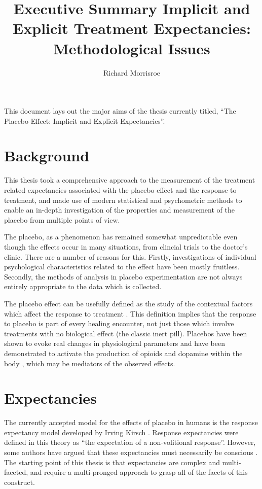 \documentclass{article}
\title{Executive Summary Implicit and Explicit Treatment Expectancies: Methodological Issues}
\author{Richard Morrisroe}
\begin{document}
\maketitle

This document lays out the major aims of the thesis currently titled, ``The Placebo Effect: Implicit and Explicit Expectancies''. 

\section{Background}
\label{sec:background}

This thesis took a comprehensive approach to the measurement of the treatment related expectancies associated with the placebo effect and the response to treatment, and made use of modern statistical and psychometric methods to enable an in-depth investigation of the properties and measurement of the placebo from multiple points of view. 

The placebo, as a phenomenon has remained somewhat unpredictable even though the effects occur in many situations, from clincial trials to the doctor's clinic. There are a number of reasons for this. Firstly, investigations of individual psychological characteristics related to the effect have been mostly fruitless. Secondly, the methods of analysis in placebo experimentation are not always entirely appropriate to the data which is collected.

The placebo effect can be usefully defined as the study of the contextual factors which affect the response to treatment \cite{Kaptchuk2008}. This definition implies that the response to placebo is part of every healing encounter, not just those which involve treatments with no biological effect (the classic inert pill). Placebos have been shown to evoke real changes in physiological parameters and have been demonstrated to activate the production of opioids and dopamine within the body \cite{Sauro2005}, which may be mediators of the observed effects.   

\section{Expectancies}
\label{sec:expectancies}

The currently accepted model for the effects of placebo in humans is the response expectancy model developed by Irving Kirsch \cite{Kirsch1997,Kirsch1985}. Response expectancies were defined in this theory as ``the expectation of a non-volitional response''. However, some authors have argued that these expectancies must necessarily be conscious \cite{Stewart-Williams2004b}. The starting point of this thesis is that expectancies are complex and multi-faceted, and require a multi-pronged approach to grasp all of the facets of this construct.
\end{document}
